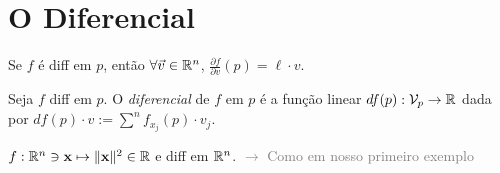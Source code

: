 \section{O Diferencial} 

\renewcommand{\hom}{\mathcal{L}}
\begin{note}
    Se \(f\) é diff em \(p\), então \(\forall \vec{v}\in \mathbb{R}^n\), \( \frac{\partial f }{\partial v}(p) = \ell \cdot v \).%
\end{note}
\begin{definition}
    Seja \(f\) diff em \(p\). O \emph{diferencial} de \(f\) em \(p\) é a função linear \(df(p):\mathcal{V}_p\to \mathbb{R}\) dada por 
    \(df(p)\cdot v := \sum^n f_{x_j}(p)\cdot v_j\).
\end{definition} %

\begin{example}
    \(f: \mathbb{R}^n \ni \textbf{x} \mapsto \|\textbf{x}\|^2 \in \mathbb{R}\) e diff em \(\mathbb{R}^n\). \textcolor{gray}{\(\rightarrow\) Como em nosso primeiro exemplo}
\end{example}



